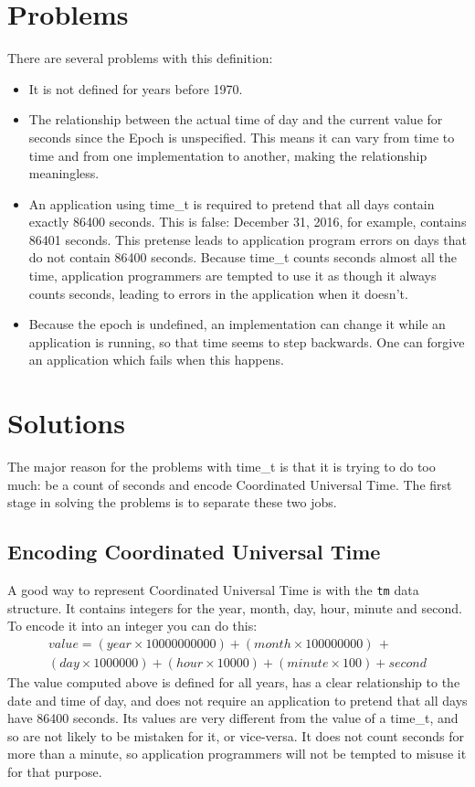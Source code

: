 \documentclass[letterpaper,twoside]{article}
\begin{document}
\section{Problems}
There are several problems with this definition:
\begin{itemize}
\item{It is not defined for years before 1970.}
\item{The relationship between the actual time of day and the current value
  for seconds since the Epoch is unspecified.
  This means it can vary from time to time
  and from one implementation to another, making the
  relationship meaningless.}
\item{An application using {\ttfamily time\_t} is required to pretend that
  all days
  contain exactly \num{86400} seconds.  This is false: December 31, 2016, for
  example, contains \num{86401} seconds.  This pretense leads to application
  program errors on days that do not contain \num{86400} seconds.
  Because {\ttfamily time\_t} counts seconds almost all the time,
  application programmers
  are tempted to use it as though it always counts seconds,
  leading to errors in the application when it doesn't.}
\item{Because the epoch is undefined, an implementation can change
  it while an application is running, so that time seems to step
  backwards.  One can forgive an application which fails when this
  happens.}
\end{itemize}

\section{Solutions}
The major reason for the problems with {\ttfamily time\_t} is that it is
trying to do
too much: be a count of seconds and encode Coordinated Universal Time.
The first stage in solving the problems is to separate these two jobs.

\subsection{Encoding Coordinated Universal Time}
A good way to represent Coordinated Universal Time is with the \verb|tm| data
structure.  It contains integers for the year, month, day, hour, minute
and second.  To encode it into an integer you can do this:
\begin{multline*}
  value = (year \times 10000000000) + (month \times 100000000) \,+ \\
  (day \times 1000000) + (hour \times 10000) + (minute \times 100) + second
\end{multline*}
The value computed above is defined for all years, has a clear relationship
to the date and time of day, and does not require an application to pretend
that all days have \num{86400} seconds.  Its values are very different from
the value of a {\ttfamily time\_t}, and so are not likely to be mistaken for it,
or vice-versa.  It does not count seconds for more than a minute, so
application programmers will not be tempted to misuse it for that purpose.
\end{document}
